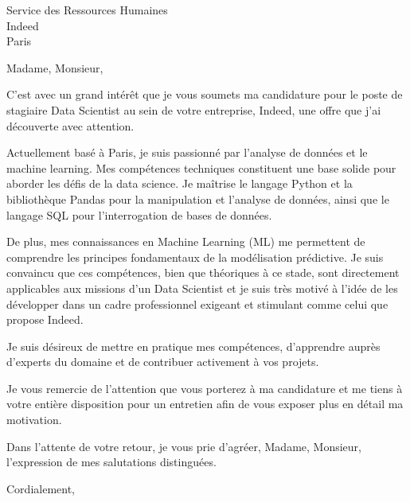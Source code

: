 \documentclass[11pt, a4paper]{letter}
\begin{document}
\begin{letter}{%
    Service des Ressources Humaines\\
    Indeed\\
    Paris
}

\opening{Madame, Monsieur,}

\subject{Candidature pour le Stage de Data Scientist}

C'est avec un grand intérêt que je vous soumets ma candidature pour le poste de stagiaire Data Scientist au sein de votre entreprise, Indeed, une offre que j'ai découverte avec attention.

Actuellement basé à Paris, je suis passionné par l'analyse de données et le machine learning. Mes compétences techniques constituent une base solide pour aborder les défis de la data science. Je maîtrise le langage Python et la bibliothèque Pandas pour la manipulation et l'analyse de données, ainsi que le langage SQL pour l'interrogation de bases de données.

De plus, mes connaissances en Machine Learning (ML) me permettent de comprendre les principes fondamentaux de la modélisation prédictive. Je suis convaincu que ces compétences, bien que théoriques à ce stade, sont directement applicables aux missions d'un Data Scientist et je suis très motivé à l'idée de les développer dans un cadre professionnel exigeant et stimulant comme celui que propose Indeed.

Je suis désireux de mettre en pratique mes compétences, d'apprendre auprès d'experts du domaine et de contribuer activement à vos projets.

Je vous remercie de l'attention que vous porterez à ma candidature et me tiens à votre entière disposition pour un entretien afin de vous exposer plus en détail ma motivation.

Dans l'attente de votre retour, je vous prie d'agréer, Madame, Monsieur, l'expression de mes salutations distinguées.

\closing{Cordialement,}

\end{letter}
\end{document}
